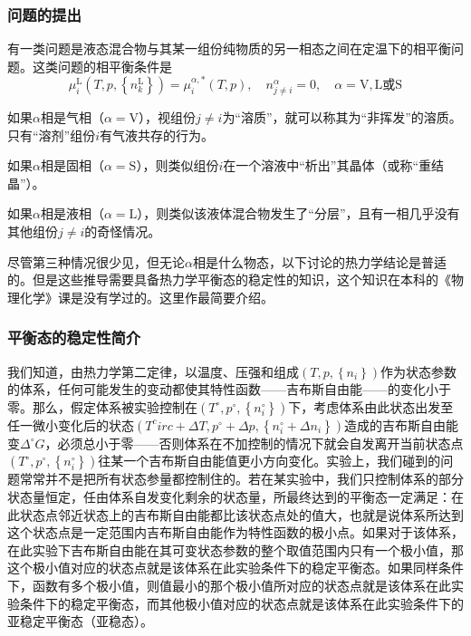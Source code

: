 \documentclass[main.tex]{subfiles}
\begin{document}
\subsubsection{问题的提出}
有一类问题是液态混合物与其某一组份纯物质的另一相态之间在定温下的相平衡问题。这类问题的相平衡条件是
\[\mu_i^\text{L}\left(T,p,\left\{n_k^\text{L}\right\}\right)=\mu_i^{\alpha,*}\left(T,p\right),\quad n_{j\neq i}^\alpha=0,\quad \alpha=\text{V},\text{L或S}\]

如果$\alpha$相是气相（$\alpha=\text{V}$），视组份$j\neq i$为“溶质”，就可以称其为“非挥发”的溶质。只有“溶剂”组份$i$有气液共存的行为。

如果$\alpha$相是固相（$\alpha=\text{S}$），则类似组份$i$在一个溶液中“析出”其晶体（或称“重结晶”）。

如果$\alpha$相是液相（$\alpha=\text{L}$），则类似该液体混合物发生了“分层”，且有一相几乎没有其他组份$j\neq i$的奇怪情况。

尽管第三种情况很少见，但无论$\alpha$相是什么物态，以下讨论的热力学结论是普适的。但是这些推导需要具备热力学平衡态的稳定性的知识，这个知识在本科的《物理化学》课是没有学过的。这里作最简要介绍。

\subsubsection{平衡态的稳定性简介}
我们知道，由热力学第二定律，以温度、压强和组成$\left(T,p,\left\{n_i\right\}\right)$作为状态参数的体系，任何可能发生的变动都使其特性函数——吉布斯自由能——的变化小于零。那么，假定体系被实验控制在$\left(T^\circ,p^\circ,\left\{n_i^\circ\right\}\right)$下，考虑体系由此状态出发至任一微小变化后的状态$\left(T^circ+\Delta T,p^\circ+\Delta p,\left\{n_i^\circ+\Delta n_i\right\}\right)$造成的吉布斯自由能变$\Delta^\circ G$，必须总小于零——否则体系在不加控制的情况下就会自发离开当前状态点$\left(T^\circ,p^\circ,\left\{n_i^\circ\right\}\right)$往某一个吉布斯自由能值更小方向变化。实验上，我们碰到的问题常常并不是把所有状态参量都控制住的。若在某实验中，我们只控制体系的部分状态量恒定，任由体系自发变化剩余的状态量，所最终达到的平衡态一定满足：在此状态点邻近状态上的吉布斯自由能都比该状态点处的值大，也就是说体系所达到这个状态点是一定范围内吉布斯自由能作为特性函数的极小点。如果对于该体系，在此实验下吉布斯自由能在其可变状态参数的整个取值范围内只有一个极小值，那这个极小值对应的状态点就是该体系在此实验条件下的稳定平衡态。如果同样条件下，函数有多个极小值，则值最小的那个极小值所对应的状态点就是该体系在此实验条件下的稳定平衡态，而其他极小值对应的状态点就是该体系在此实验条件下的亚稳定平衡态（亚稳态）。
\end{document}

